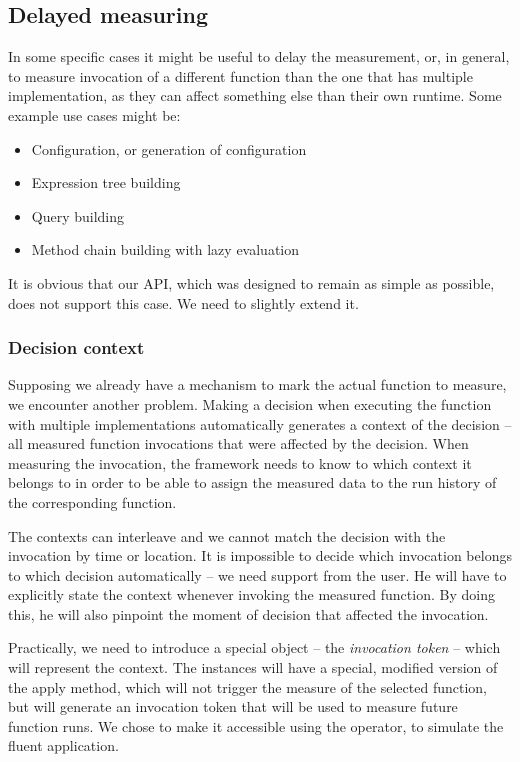 \subsection{Delayed measuring}
\label{subsec:delayed_measuring}

In some specific cases it might be useful to delay the measurement, or, in general, to measure invocation of a different function than the one that has multiple implementation, as they can affect something else than their own runtime. Some example use cases might be:

\begin{itemize}
	\item Configuration, or generation of configuration
	\item Expression tree building
	\item Query building
	\item Method chain building with lazy evaluation
\end{itemize}

It is obvious that our API, which was designed to remain as simple as possible, does not support this case. We need to slightly extend it.

\subsubsection{Decision context}

Supposing we already have a mechanism to mark the actual function to measure, we encounter another problem. Making a decision when executing the function with multiple implementations automatically generates a context of the decision -- all measured function invocations that were affected by the decision. When measuring the invocation, the framework needs to know to which context it belongs to in order to be able to assign the measured data to the run history of the corresponding function.

The contexts can interleave and we cannot match the decision with the invocation by time or location. It is impossible to decide which invocation belongs to which decision automatically -- we need support from the user. He will have to explicitly state the context whenever invoking the measured function. By doing this, he will also pinpoint the moment of decision that affected the invocation.

Practically, we need to introduce a special object -- the \textit{invocation token} -- which will represent the context. The  instances will have a special, modified version of the apply method, which will not trigger the measure of the selected function, but will generate an invocation token that will be used to measure future function runs. We chose to make it accessible using the \inlinecode{\textasciicircum()} operator, to simulate the fluent application.

